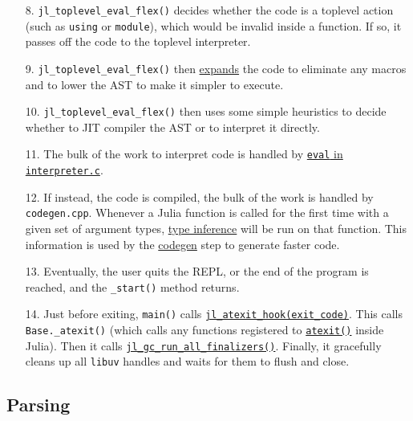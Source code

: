 \begin{itemize}
\item[8.  ] \texttt{jl\_toplevel\_eval\_flex()} decides whether the code is a {\textquotedbl}toplevel{\textquotedbl} action (such as \texttt{using} or \texttt{module}), which would be invalid inside a function. If so, it passes off the code to the toplevel interpreter.


\item[9.  ] \texttt{jl\_toplevel\_eval\_flex()} then \hyperlink{16669853702383402486}{expands} the code to eliminate any macros and to {\textquotedbl}lower{\textquotedbl} the AST to make it simpler to execute.


\item[10. ] \texttt{jl\_toplevel\_eval\_flex()} then uses some simple heuristics to decide whether to JIT compiler the  AST or to interpret it directly.


\item[11. ] The bulk of the work to interpret code is handled by \href{https://github.com/JuliaLang/julia/blob/master/src/interpreter.c}{\texttt{eval} in \texttt{interpreter.c}}.


\item[12. ] If instead, the code is compiled, the bulk of the work is handled by \texttt{codegen.cpp}. Whenever a  Julia function is called for the first time with a given set of argument types, \hyperlink{6510123671388929580}{type inference}  will be run on that function. This information is used by the \hyperlink{526576549562645049}{codegen} step to generate  faster code.


\item[13. ] Eventually, the user quits the REPL, or the end of the program is reached, and the \texttt{\_start()}  method returns.


\item[14. ] Just before exiting, \texttt{main()} calls \href{https://github.com/JuliaLang/julia/blob/master/src/init.c}{\texttt{jl\_atexit\_hook(exit\_code)}}.  This calls \texttt{Base.\_atexit()} (which calls any functions registered to \hyperlink{17479944696971324992}{\texttt{atexit()}} inside  Julia). Then it calls \href{https://github.com/JuliaLang/julia/blob/master/src/gc.c}{\texttt{jl\_gc\_run\_all\_finalizers()}}.  Finally, it gracefully cleans up all \texttt{libuv} handles and waits for them to flush and close.

\end{itemize}


\hypertarget{6801832859572424777}{}


\subsection{Parsing}



